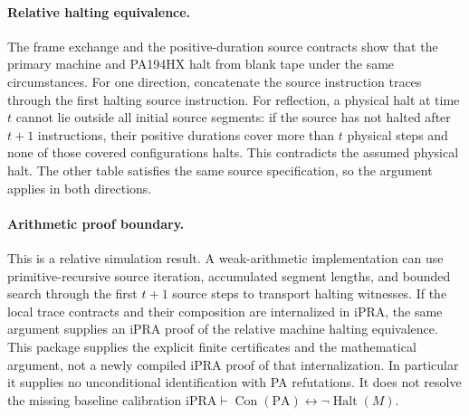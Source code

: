 \paragraph{Relative halting equivalence.}
The frame exchange and the positive-duration source contracts show that the
primary machine and PA194HX halt from blank tape under the same circumstances.
For one direction, concatenate the source instruction traces through the
first halting source instruction.  For reflection, a physical halt at time
$t$ cannot lie outside all initial source segments: if the source has not
halted after $t+1$ instructions, their positive durations cover more than
$t$ physical steps and none of those covered configurations halts.  This
contradicts the assumed physical halt.  The other table satisfies the same
source specification, so the argument applies in both directions.

\paragraph{Arithmetic proof boundary.}
This is a relative simulation result.  A weak-arithmetic implementation can
use primitive-recursive source iteration, accumulated segment lengths, and
bounded search through the first $t+1$ source steps to transport halting
witnesses.  If the local trace contracts and their composition are internalized
in iPRA, the same argument supplies an iPRA proof of the relative machine
halting equivalence.  This package supplies the explicit finite certificates
and the mathematical argument, not a newly compiled iPRA proof of that
internalization.  In particular it supplies no unconditional identification
with PA refutations.  It does not resolve the missing baseline calibration
\(\mathrm{iPRA}\vdash\operatorname{Con}(\mathrm{PA})\leftrightarrow
\neg\operatorname{Halt}(M)\).

